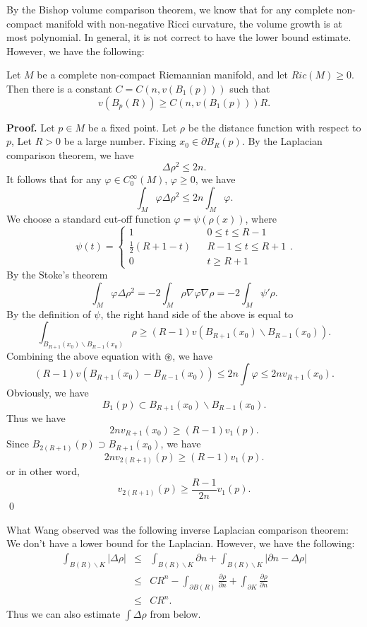 By the Bishop volume comparison theorem, we know that for any complete 
non-compact manifold with non-negative Ricci curvature, the volume growth is at
most polynomial. In general, it is not correct to have the lower bound estimate.
However, we have the following:
\begin{theorem}
Let $M$ be a complete non-compact Riemannian manifold, and let 
$Ric(M)\geqslant 0$. Then there is a constant $C = C(n,v(B_1(p)))$ such that
\[
v(B_p(R)) \geqslant C(n,v(B_1(p)))R.
\]
\end{theorem}
{\bf Proof.}
Let $p\in M$ be a fixed point. Let $\rho$ be the distance function with respect
to $p$, Let $R>0$ be a large number. Fixing $x_0\in \partial B_R(p)$. By the 
Laplacian comparison theorem, we have
\[
\Delta\rho^2 \leqslant 2n.
\]
It follows that for any $\varphi\in C_0^\infty(M)$, $\varphi\geqslant 0$, we
have
\begin{equation}\label{4-1}
\int_M \varphi\Delta\rho^2 \leqslant 2n\int_M\varphi.
\end{equation}
We choose a standard cut-off function $\varphi=\psi(\rho(x))$, where
\[
\psi(t) = \left\{\begin{array}{lcl}
1 & & 0 \leqslant t \leqslant R-1 \\
\frac{1}{2}(R+1-t) & & R-1 \leqslant t \leqslant R+1 \\
0 & & t \geqslant R+1
\end{array}
\right..
\]
By the Stoke's theorem
\[
\int_M \varphi\Delta\rho^2 = -2\int_M \rho\nabla\varphi\nabla\rho =
-2\int_M \psi ' \rho.
\]
By the definition of $\psi$, the right hand side of the above is equal to
\[
\int_{B_{R+1}(x_0)\backslash B_{R-1}(x_0)} \rho \geqslant
(R-1)v(B_{R+1}(x_0)\backslash B_{R-1}(x_0)).
\]
Combining the above equation with $\circledast$, we have
\[
(R-1)v(B_{R+1}(x_0)-B_{R-1}(x_0)) \leqslant 2n\int\varphi \leqslant 
2nv_{R+1}(x_0).
\]
Obviously, we have
\[
B_1(p) \subset B_{R+1}(x_0)\backslash B_{R-1}(x_0).
\]
Thus we have
\[
2nv_{R+1}(x_0)\geqslant (R-1)v_1(p).
\]
Since $B_{2(R+1)}(p) \supset B_{R+1}(x_0)$, we have
\[
2nv_{2(R+1)}(p) \geqslant (R-1)v_1(p).
\]
or in other word,
\[
v_{2(R+1)}(p) \geqslant \frac{R-1}{2n}v_1(p).
\]
\qed

What Wang observed was the following inverse Laplacian comparison theorem: We
don't have a lower bound for the Laplacian. However, we have the following:
\begin{eqnarray}
\nonumber \int_{B(R)\backslash K} |\Delta\rho| & \leqslant &
\int_{B(R)\backslash K} \partial n + \int_{B(R)\backslash K} |\partial n - 
\Delta \rho| \\
\nonumber & \leqslant & CR^n - \int_{\partial B(R)}\frac{\partial\rho}
{\partial n} + \int_{\partial K}\frac{\partial\rho}{\partial n} \\
\nonumber & \leqslant & CR^n.
\end{eqnarray}
Thus we can also estimate $\int\Delta\rho$ from below.
\\

